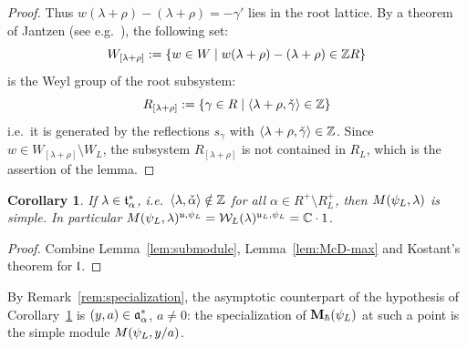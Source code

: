 \documentclass{article}
\theoremstyle{plain}
\newtheorem{corollary}[theorem]{Corollary}
\theoremstyle{definition}
\theoremstyle{remark}
\numberwithin{equation}{section}
\begin{document}
\begin{proof}
Thus $w(\lambda+\rho)-(\lambda+\rho)=-\gamma'$ lies in the root lattice. By a theorem of Jantzen (see e.g.\ \cite[\S3.4]{humphreysrepresentations}), the following set:
\begin{equation*}
    W_{[\lambda+\rho]}:=\{w\in W\mid w(\lambda+\rho)-(\lambda+\rho)\in\mathbb{Z} R\}
\end{equation*}
is the Weyl group of the root subsystem:
\begin{equation*}
    R_{[\lambda+\rho]}:=\{\gamma\in R\mid\langle\lambda+\rho,\check\gamma\rangle\in\mathbb{Z}\}
\end{equation*}
i.e.\ it is generated by the reflections $s_\gamma$ with $\langle\lambda+\rho,\check\gamma\rangle\in\mathbb{Z}$. Since $w\in W_{[\lambda+\rho]}\setminus W_L$, the subsystem $R_{[\lambda+\rho]}$ is not contained in $R_L$, which is the assertion of the lemma.
\end{proof}

\begin{corollary}\label{cor:simple}
If $\lambda\in\mathfrak{t}^*_\alpha$, i.e.\ $\langle\lambda,\check\alpha\rangle\notin\mathbb{Z}$ for all $\alpha\in R^+\setminus R^+_L$, then $M(\psi_L,\lambda)$ is simple. In particular $M(\psi_L,\lambda)^{\mathfrak{u},\psi_L}=\mathcal{W}_L(\lambda)^{\mathfrak{u}_L,\psi_L}=\mathbb{C}\cdot1$.
\end{corollary}

\begin{proof}
Combine Lemma~\ref{lem:submodule}, Lemma~\ref{lem:McD-max} and Kostant's theorem for $\mathfrak{l}$.
\end{proof}

By Remark~\ref{rem:specialization}, the asymptotic counterpart of the hypothesis of Corollary~\ref{cor:simple} is $(y,a)\in\mathfrak{a}^*_{\alpha}$, $a\neq0$: the specialization of $\mathbf{M}_\hbar(\psi_L)$ at such a point is the simple module $M(\psi_L,y/a)$.
\end{document}
